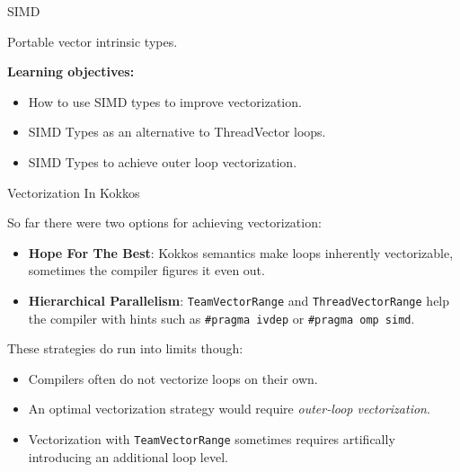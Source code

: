 

\begin{frame}[fragile]

  {\Huge SIMD}

  \vspace{10pt}

  {\large Portable vector intrinsic types.}

  \vspace{20pt}

  \textbf{Learning objectives:}
  \begin{itemize}
    \item {How to use SIMD types to improve vectorization.}
    \item {SIMD Types as an alternative to ThreadVector loops.}
    \item {SIMD Types to achieve outer loop vectorization.}
  \end{itemize}

  \vspace{-20pt}

\end{frame}


\begin{frame}[fragile]{Vectorization In Kokkos}

   So far there were two options for achieving vectorization: 

\begin{itemize}
  \item{{\textbf{Hope For The Best}}: Kokkos semantics make loops inherently vectorizable, sometimes the compiler figures it even out.}
  \item{{\textbf{Hierarchical Parallelism}}: {\texttt{TeamVectorRange}} and {\texttt{ThreadVectorRange}} help the compiler with hints such as {\texttt{\#pragma ivdep}} or {\texttt{\#pragma omp simd}}}.
\end{itemize}

   \vspace{3pt}

  These strategies do run into limits though:

\begin{itemize}
  \item{Compilers often do not vectorize loops on their own.}
  \item{An optimal vectorization strategy would require \emph{outer-loop vectorization}.}
  \item{Vectorization with \texttt{TeamVectorRange} sometimes requires artifically introducing an additional loop level.}
\end{itemize}
\end{frame}


